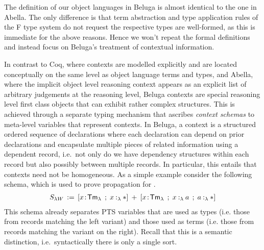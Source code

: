 The definition of our object languages in Beluga is almost identical to the one in Abella.
The only difference is that term abstraction and type application rules of the F type system do not request the respective types are well-formed, as this is immediate for the above reasons.
Hence we won't repeat the formal definitions and instead focus on Beluga's treatment of contextual information.

In contrast to Coq, where contexts are modelled explicitly and are located conceptually on the same level as object language terms and types, and Abella, where the implicit object level reasoning context appears as an explicit list of arbitrary judgements at the reasoning level, Beluga contexts are special reasoning level first class objects that can exhibit rather complex structures.
%
This is achieved through a separate typing mechanism that ascribes \emph{context schemas} to meta-level variables that represent contexts.
In Beluga, a context is a structured ordered sequence of declarations where each declaration can depend on prior declarations and encapsulate multiple pieces of related information using a dependent record, i.e.~not only do we have dependency structures within each record but also possibly between multiple records.
In particular, this entails that contexts need not be homogeneous.  
As a simple example consider the following schema, which is used to prove propagation for \SysL.
\begin{align*}
  S_{\lambda W} \eqdef [x\of\TmL \mrel{;} \typingLh{x}{\Prp}] \mrel{+} [x\of\TmL \mrel{;} \typingLh{x}{a} \mrel{;} \typingLh{a}{\Prp}]
\end{align*}
This schema already separates PTS variables that are used as types (i.e. those from records matching the left variant) and those used as terms (i.e. those from records matching the variant on the right).
Recall that this is a semantic distinction, i.e.~syntactically there is only a single sort.

